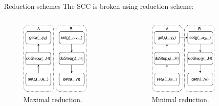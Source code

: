 \documentclass{beamer}
\begin{document}
\begin{frame}{Reduction schemes}
    The SCC is broken using reduction scheme:
    \begin{columns}[T] 
        \begin{column}{.48\textwidth}
            \begin{figure}    
                \includegraphics[width=0.8\textwidth]{images/jacobian_reduced_graph.pdf}
                \caption{Maximal reduction.}
            \end{figure}  
        \end{column}
    \hfill%
    \begin{column}{.48\textwidth}
        \begin{figure}    
            \centering
            \includegraphics[width=0.8\textwidth]{images/gauss_reduced_graph.pdf}
            \caption{Minimal reduction.}
        \end{figure}
    \end{column}
    \end{columns}
\end{frame}
\end{document}

